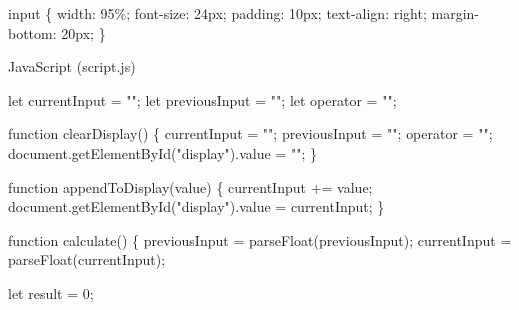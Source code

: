 \documentclass[
  letterpaper,
]{book}
\newenvironment{Shaded}{\begin{snugshade}}{\end{snugshade}}
\newcommand{\AttributeTok}[1]{\textcolor[rgb]{0.40,0.45,0.13}{#1}}
\newcommand{\BuiltInTok}[1]{\textcolor[rgb]{0.00,0.23,0.31}{#1}}
\newcommand{\DataTypeTok}[1]{\textcolor[rgb]{0.68,0.00,0.00}{#1}}
\newcommand{\DecValTok}[1]{\textcolor[rgb]{0.68,0.00,0.00}{#1}}
\newcommand{\FunctionTok}[1]{\textcolor[rgb]{0.28,0.35,0.67}{#1}}
\newcommand{\KeywordTok}[1]{\textcolor[rgb]{0.00,0.23,0.31}{#1}}
\newcommand{\NormalTok}[1]{\textcolor[rgb]{0.00,0.23,0.31}{#1}}
\newcommand{\OperatorTok}[1]{\textcolor[rgb]{0.37,0.37,0.37}{#1}}
\newcommand{\PreprocessorTok}[1]{\textcolor[rgb]{0.68,0.00,0.00}{#1}}
\newcommand{\StringTok}[1]{\textcolor[rgb]{0.13,0.47,0.30}{#1}}
\begin{document}
\begin{tcolorbox}
\begin{Shaded}
\begin{Highlighting}[]
\NormalTok{input \{}
  \KeywordTok{width}\NormalTok{: }\DecValTok{95}\DataTypeTok{\%}\OperatorTok{;}
  \KeywordTok{font{-}size}\NormalTok{: }\DecValTok{24}\DataTypeTok{px}\OperatorTok{;}
  \KeywordTok{padding}\NormalTok{: }\DecValTok{10}\DataTypeTok{px}\OperatorTok{;}
  \KeywordTok{text{-}align}\NormalTok{: }\DecValTok{right}\OperatorTok{;}
  \KeywordTok{margin{-}bottom}\NormalTok{: }\DecValTok{20}\DataTypeTok{px}\OperatorTok{;}
\NormalTok{\}}
\end{Highlighting}
\end{Shaded}

JavaScript (script.js)

\begin{Shaded}
\begin{Highlighting}[]
\KeywordTok{let}\NormalTok{ currentInput }\OperatorTok{=} \StringTok{""}\OperatorTok{;}
\KeywordTok{let}\NormalTok{ previousInput }\OperatorTok{=} \StringTok{""}\OperatorTok{;}
\KeywordTok{let}\NormalTok{ operator }\OperatorTok{=} \StringTok{""}\OperatorTok{;}

\KeywordTok{function} \FunctionTok{clearDisplay}\NormalTok{() \{}
\NormalTok{  currentInput }\OperatorTok{=} \StringTok{""}\OperatorTok{;}
\NormalTok{  previousInput }\OperatorTok{=} \StringTok{""}\OperatorTok{;}
\NormalTok{  operator }\OperatorTok{=} \StringTok{""}\OperatorTok{;}
  \BuiltInTok{document}\OperatorTok{.}\FunctionTok{getElementById}\NormalTok{(}\StringTok{"display"}\NormalTok{)}\OperatorTok{.}\AttributeTok{value} \OperatorTok{=} \StringTok{""}\OperatorTok{;}
\NormalTok{\}}

\KeywordTok{function} \FunctionTok{appendToDisplay}\NormalTok{(value) \{}
\NormalTok{  currentInput }\OperatorTok{+=}\NormalTok{ value}\OperatorTok{;}
  \BuiltInTok{document}\OperatorTok{.}\FunctionTok{getElementById}\NormalTok{(}\StringTok{"display"}\NormalTok{)}\OperatorTok{.}\AttributeTok{value} \OperatorTok{=}\NormalTok{ currentInput}\OperatorTok{;}
\NormalTok{\}}

\KeywordTok{function} \FunctionTok{calculate}\NormalTok{() \{}
\NormalTok{  previousInput }\OperatorTok{=} \PreprocessorTok{parseFloat}\NormalTok{(previousInput)}\OperatorTok{;}
\NormalTok{  currentInput }\OperatorTok{=} \PreprocessorTok{parseFloat}\NormalTok{(currentInput)}\OperatorTok{;}

  \KeywordTok{let}\NormalTok{ result }\OperatorTok{=} \DecValTok{0}\OperatorTok{;}


\end{Highlighting}
\end{Shaded}
\end{tcolorbox}
\end{document}
